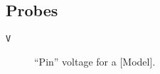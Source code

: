 \subsection{Probes}

\begin{description}

\item[{\tt V}] ``Pin'' voltage for a [Model].

\end{description}
